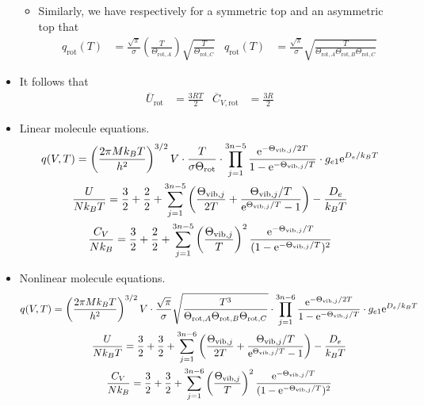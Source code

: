 \documentclass[../notes.tex]{subfiles}
\begin{document}
\begin{itemize}
\begin{itemize}
\begin{itemize}
        \end{itemize}
        \item Similarly, we have respectively for a symmetric top and an asymmetric top that
        \begin{align*}
            q_\text{rot}(T) &= \frac{\sqrt{\pi}}{\sigma}\left( \frac{T}{\Theta_{\text{rot},A}} \right)\sqrt{\frac{T}{\Theta_{\text{rot},C}}}&
            q_\text{rot}(T) &= \frac{\sqrt{\pi}}{\sigma}\sqrt{\frac{T}{\Theta_{\text{rot},A}\Theta_{\text{rot},B}\Theta_{\text{rot},C}}}
        \end{align*}
    \end{itemize}
    \item It follows that
    \begin{align*}
        \overline{U}_\text{rot} &= \frac{3RT}{2}&
        \overline{C}_{V,\text{rot}} &= \frac{3R}{2}
    \end{align*}
    \item Linear molecule equations.
    \begin{gather*}
        q(V,T) = \left( \frac{2\pi Mk_BT}{h^2} \right)^{3/2}V\cdot\frac{T}{\sigma\Theta_\text{rot}}\cdot\prod_{j=1}^{3n-5}\frac{\e[-\Theta_{\text{vib},j}/2T]}{1-\e[-\Theta_{\text{vib},j}/T]}\cdot g_{e1}\e[D_e/k_BT]\\
        \frac{U}{Nk_BT} = \frac{3}{2}+\frac{2}{2}+\sum_{j=1}^{3n-5}\left( \frac{\Theta_{\text{vib},j}}{2T}+\frac{\Theta_{\text{vib},j}/T}{\e[\Theta_{\text{vib},j}/T]-1} \right)-\frac{D_e}{k_BT}\\
        \frac{C_V}{Nk_B} = \frac{3}{2}+\frac{2}{2}+\sum_{j=1}^{3n-5}\left( \frac{\Theta_{\text{vib},j}}{T} \right)^2\frac{\e[-\Theta_{\text{vib},j}/T]}{(1-\e[-\Theta_{\text{vib},j}/T])^2}
    \end{gather*}
    \item Nonlinear molecule equations.
    \begin{gather*}
        q(V,T) = \left( \frac{2\pi Mk_BT}{h^2} \right)^{3/2}V\cdot\frac{\sqrt{\pi}}{\sigma}\sqrt{\frac{T^3}{\Theta_{\text{rot},A}\Theta_{\text{rot},B}\Theta_{\text{rot},C}}}\cdot\prod_{j=1}^{3n-6}\frac{\e[-\Theta_{\text{vib},j}/2T]}{1-\e[-\Theta_{\text{vib},j}/T]}\cdot g_{e1}\e[D_e/k_BT]\\
        \frac{U}{Nk_BT} = \frac{3}{2}+\frac{3}{2}+\sum_{j=1}^{3n-6}\left( \frac{\Theta_{\text{vib},j}}{2T}+\frac{\Theta_{\text{vib},j}/T}{\e[\Theta_{\text{vib},j}/T]-1} \right)-\frac{D_e}{k_BT}\\
        \frac{C_V}{Nk_B} = \frac{3}{2}+\frac{3}{2}+\sum_{j=1}^{3n-6}\left( \frac{\Theta_{\text{vib},j}}{T} \right)^2\frac{\e[-\Theta_{\text{vib},j}/T]}{(1-\e[-\Theta_{\text{vib},j}/T])^2}
    \end{gather*}
\end{itemize}
\end{document}
